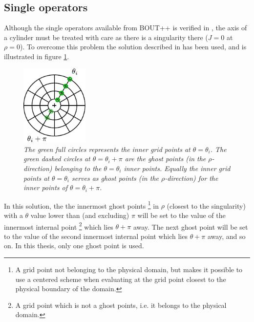 \subsection{Single operators}
%
Although the single operators available from BOUT++ is verified in \cite{Dudson2016}, the axis of a cylinder must be treated with care as there is a singularity there ($J=0$ at $\rho=0$).
To overcome this problem the solution described in \cite{Naulin2008} has been used, and is illustrated in figure \ref{fig:innerRho}.
%
\begin{figure}[htb]
    \centering
    \includegraphics[width=0.3\textwidth]{fig/innerGhost}
    \caption{\textit{
        The green full circles represents the inner grid points at
        $\theta=\theta_i$. The green dashed circles at $\theta=\theta_i + \pi$
        are the ghost points (in the $\rho$-direction) belonging to the
        $\theta=\theta_i$ inner points. Equally the inner grid points at
        $\theta=\theta_i$ serves as ghost points (in the $\rho$-direction) for
        the inner points of $\theta=\theta_i + \pi$.
    }}
    \label{fig:innerRho}
\end{figure}
%
In this solution, the the innermost ghost points%
\footnote{A grid point not belonging to the physical domain, but makes it possible to use a centered scheme when evaluating at the grid point closest to the physical boundary of the domain.}
in $\rho$ (closest to the singularity) with a $\theta$ value lower than (and excluding) $\pi$ will be set to the value of the innermost internal point%
\footnote{A grid point which is not a ghost points, i.e. it belongs to the physical domain.}%
%
which lies $\theta + \pi$ away.
The next ghost point will be set to the value of the second innermost internal point which lies $\theta + \pi$ away, and so on.
In this thesis, only one ghost point is used.

